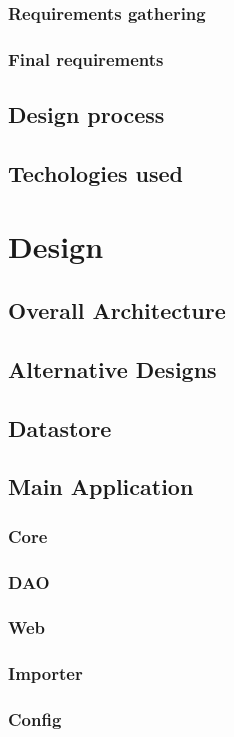 \subsection{Requirements gathering}
\subsection{Final requirements}
\section{Design process}
\section{Techologies used}



\chapter{Design}
\section{Overall Architecture}
\section{Alternative Designs}
\section{Datastore}
\section{Main Application}
\subsection{Core}
\subsection{DAO}
\subsection{Web}
\subsection{Importer}
\subsection{Config}
